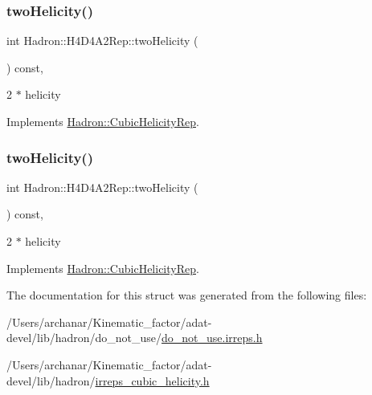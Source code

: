\subsubsection{\texorpdfstring{twoHelicity()}{twoHelicity()}\hspace{0.1cm}{\footnotesize\ttfamily [2/3]}}
{\footnotesize\ttfamily int Hadron\+::\+H4\+D4\+A2\+Rep\+::two\+Helicity (\begin{DoxyParamCaption}{ }\end{DoxyParamCaption}) const\hspace{0.3cm}{\ttfamily [inline]}, {\ttfamily [virtual]}}

2 $\ast$ helicity 

Implements \mbox{\hyperlink{structHadron_1_1CubicHelicityRep_af507aa56fc2747eacc8cb6c96db31ecc}{Hadron\+::\+Cubic\+Helicity\+Rep}}.

\mbox{\label{structHadron_1_1H4D4A2Rep_a6ea29d2750a22f6ef02172b0482e32e5}} 
\subsubsection{\texorpdfstring{twoHelicity()}{twoHelicity()}\hspace{0.1cm}{\footnotesize\ttfamily [3/3]}}
{\footnotesize\ttfamily int Hadron\+::\+H4\+D4\+A2\+Rep\+::two\+Helicity (\begin{DoxyParamCaption}{ }\end{DoxyParamCaption}) const\hspace{0.3cm}{\ttfamily [inline]}, {\ttfamily [virtual]}}

2 $\ast$ helicity 

Implements \mbox{\hyperlink{structHadron_1_1CubicHelicityRep_af507aa56fc2747eacc8cb6c96db31ecc}{Hadron\+::\+Cubic\+Helicity\+Rep}}.



The documentation for this struct was generated from the following files\+:\begin{DoxyCompactItemize}
\item 
/\+Users/archanar/\+Kinematic\+\_\+factor/adat-\/devel/lib/hadron/do\+\_\+not\+\_\+use/\mbox{\hyperlink{adat-devel_2lib_2hadron_2do__not__use_2do__not__use_8irreps_8h}{do\+\_\+not\+\_\+use.\+irreps.\+h}}\item 
/\+Users/archanar/\+Kinematic\+\_\+factor/adat-\/devel/lib/hadron/\mbox{\hyperlink{adat-devel_2lib_2hadron_2irreps__cubic__helicity_8h}{irreps\+\_\+cubic\+\_\+helicity.\+h}}\end{DoxyCompactItemize}
